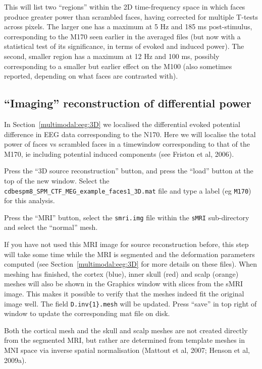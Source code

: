 This will list two ``regions'' within the 2D time-frequency space in which faces produce greater power than scrambled faces, having corrected for multiple T-tests across pixels. The larger one has a maximum at 5 Hz and 185 ms post-stimulus, corresponding to the M170 seen earlier in the averaged files (but now with a statistical test of its significance, in terms of evoked and induced power). The second, smaller region has a maximum at 12 Hz and 100 ms, possibly corresponding to a smaller but earlier effect on the M100 (also sometimes reported, depending on what faces are contrasted with).

\subsection{``Imaging'' reconstruction of differential power}

In Section~\ref{multimodal:eeg:3D} we localised the differential evoked potential difference in EEG data corresponding to the N170.  Here we will localise the total power of faces vs scrambled faces in a timewindow corresponding to that of the M170, ie including potential induced components (see Friston et al, 2006).

Press the ``3D source reconstruction'' button, and press the ``load'' button at the top of the new window. Select the \texttt{cdbespm8\_SPM\_CTF\_MEG\_example\_faces1\_3D.mat} file and type a label (eg \texttt{M170}) for this analysis.

Press the ``MRI'' button, select the \texttt{smri.img} file within the \texttt{sMRI} sub-directory and select the ``normal'' mesh.

If you have not used this MRI image for source reconstruction before, this step will take some time while the MRI is segmented and the deformation parameters computed (see Section~\ref{multimodal:eeg:3D} for more details on these files). When meshing has finished, the cortex (blue), inner skull (red) and scalp (orange) meshes will also be shown in the Graphics window with slices from the sMRI image. This makes it possible to verify that the meshes indeed fit the original image well. The field \texttt{D.inv\{1\}.mesh} will be updated. Press ``save'' in top right of window to update the corresponding mat file on disk.

Both the cortical mesh and the skull and scalp meshes are not created directly from the segmented MRI, but rather are determined from template meshes in MNI space via inverse spatial normalisation (Mattout et al, 2007; Henson et al, 2009a).

